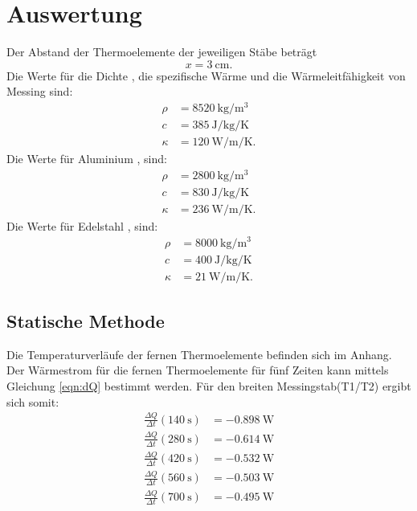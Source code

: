 \section{Auswertung}
\label{sec:Auswertung}
Der Abstand der Thermoelemente der jeweiligen Stäbe beträgt
\begin{equation*}
    x = \SI{3}{\centi\meter}.
\end{equation*}
Die Werte für die Dichte \cite{V204}, die spezifische Wärme \cite{V204} und 
die Wärmeleitfähigkeit \cite{wiki} von Messing sind: 
\begin{align*}
    \rho &= \SI{8520}{\kilo\gram\per\cubic\meter} \\
    c &= \SI{385}{\joule\per\kilo\gram\per\kelvin} \\
    \kappa &= \SI{120}{\watt\per\meter\per\kelvin}.
\end{align*}
Die Werte für Aluminium \cite{V204}, \cite{wiki} sind:
\begin{align*}
    \rho &= \SI{2800}{\kilo\gram\per\cubic\meter} \\
    c &= \SI{830}{\joule\per\kilo\gram\per\kelvin} \\
    \kappa &= \SI{236}{\watt\per\meter\per\kelvin}.
\end{align*}
Die Werte für Edelstahl \cite{V204}, \cite{edelstahl} sind:
\begin{align*}
    \rho &= \SI{8000}{\kilo\gram\per\cubic\meter} \\
    c &= \SI{400}{\joule\per\kilo\gram\per\kelvin} \\
    \kappa &= \SI{21}{\watt\per\meter\per\kelvin}.
\end{align*}

\subsection{Statische Methode}



Die Temperaturverläufe der fernen Thermoelemente
befinden sich im Anhang. %
\newline
Der Wärmestrom für die fernen Thermoelemente für fünf Zeiten kann mittels
Gleichung \ref{eqn:dQ} bestimmt werden. %
Für den breiten Messingstab(T1/T2) ergibt sich somit:
\begin{align*} %
   \frac{\Delta Q}{\Delta t}(\SI{140}{\second}) &= \SI{-0.898}{\watt} \\ 
   \frac{\Delta Q}{\Delta t}(\SI{280}{\second}) &= \SI{-0.614}{\watt} \\ 
   \frac{\Delta Q}{\Delta t}(\SI{420}{\second}) &= \SI{-0.532}{\watt} \\ 
   \frac{\Delta Q}{\Delta t}(\SI{560}{\second}) &= \SI{-0.503}{\watt} \\ 
   \frac{\Delta Q}{\Delta t}(\SI{700}{\second}) &= \SI{-0.495}{\watt} \\ 
\end{align*}

